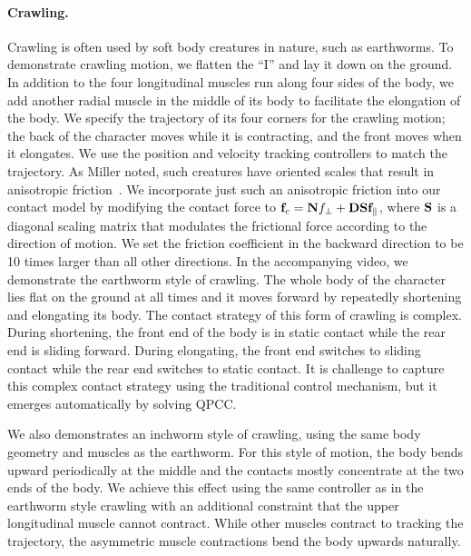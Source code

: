 \paragraph{Crawling.} Crawling is often used by soft body creatures in
nature, such as earthworms.  To demonstrate crawling motion, we
flatten the ``I'' and lay it down on the ground. In addition to the
four longitudinal muscles run along four sides of the body, we add
another radial muscle in the middle of its body to facilitate the
elongation of the body. We specify the trajectory of its four
corners for the crawling motion; the back of the character moves while
it is contracting, and the front moves when it elongates.  We use the
position and velocity tracking controllers to match the trajectory. As
Miller noted, such creatures have oriented scales that result in
anisotropic friction~\cite{Miller:1988}.  We incorporate just such an
anisotropic friction into our contact model by modifying the contact
force to $\mathbf{f}_c=\mathbf{N}f_\perp+\mathbf{DS}\mathbf{f}_\parallel$, where
$\mathbf{S}$ is a diagonal scaling matrix that modulates the frictional
force according to the direction of motion. We set the friction
coefficient in the backward direction to be 10 times larger than all
other directions. In the accompanying video, we demonstrate the
earthworm style of crawling. The whole body of the character lies flat
on the ground at all times and it moves forward by repeatedly
shortening and elongating its body. The contact strategy of this form
of crawling is complex. During shortening, the front end of the body
is in static contact while the rear end is sliding forward. During
elongating, the front end switches to sliding contact while the rear
end switches to static contact. It is challenge to capture this
complex contact strategy using the traditional control mechanism, but
it emerges automatically by solving QPCC.

We also demonstrates an inchworm style of crawling, using the same
body geometry and muscles as the earthworm. For this style of motion,
the body bends upward periodically at the middle and the contacts
mostly concentrate at the two ends of the body. We achieve this effect
using the same controller as in the earthworm style crawling with an
additional constraint that the upper longitudinal muscle cannot
contract.  While other muscles contract to tracking the trajectory,
the asymmetric muscle contractions bend the body upwards naturally.

